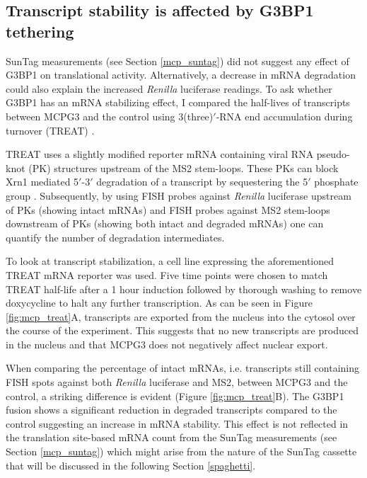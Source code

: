 \subsection{Transcript stability is affected by G3BP1 tethering} \label{mcp_treat}

SunTag measurements (see Section \ref{mcp_suntag}) did not suggest any effect of G3BP1 on translational activity.
Alternatively, a decrease in mRNA degradation could also explain the increased \textit{Renilla} luciferase readings.
To ask whether G3BP1 has an mRNA stabilizing effect, I compared the half-lives of transcripts between MCPG3 and the control using 3(three)$'$-RNA end accumulation during turnover (TREAT) \cite{horvathova_dynamics_2017}.

TREAT uses a slightly modified reporter mRNA containing viral RNA pseudo-knot (PK) structures upstream of the MS2 stem-loops.
These PKs can block Xrn1 mediated 5$'$-3$'$ degradation of a transcript by sequestering the 5$'$ phosphate group \cite{kieft_new_2015}.
Subsequently, by using FISH probes against \textit{Renilla} luciferase upstream of PKs (showing intact mRNAs) and FISH probes against MS2 stem-loops downstream of PKs (showing both intact and degraded mRNAs) one can quantify the number of degradation intermediates.

To look at transcript stabilization, a cell line expressing the aforementioned TREAT mRNA reporter was used.
Five time points were chosen to match TREAT half-life after a 1 hour induction followed by thorough washing to remove doxycycline to halt any further transcription.
As can be seen in Figure \ref{fig:mcp_treat}A, transcripts are exported from the nucleus into the cytosol over the course of the experiment.
This suggests that no new transcripts are produced in the nucleus and that MCPG3 does not negatively affect nuclear export.

When comparing the percentage of intact mRNAs, i.e. transcripts still containing FISH spots against both \textit{Renilla} luciferase and MS2, between MCPG3 and the control, a striking difference is evident (Figure \ref{fig:mcp_treat}B).
The G3BP1 fusion shows a significant reduction in degraded transcripts compared to the control suggesting an increase in mRNA stability.
This effect is not reflected in the translation site-based mRNA count from the SunTag measurements (see Section \ref{mcp_suntag}) which might arise from the nature of the SunTag cassette that will be discussed in the following Section \ref{spaghetti}.


